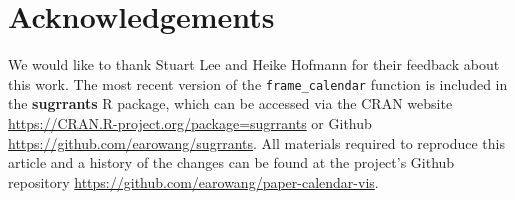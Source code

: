 \documentclass[12pt]{article}
\begin{document}
\hypertarget{acknowledgements}{%
\section*{Acknowledgements}\label{acknowledgements}}

We would like to thank Stuart Lee and Heike Hofmann for their feedback about this work. The most recent version of the \texttt{frame\_calendar} function is included in the \textbf{sugrrants} R package, which can be accessed via the CRAN website \url{https://CRAN.R-project.org/package=sugrrants} or Github \url{https://github.com/earowang/sugrrants}. All materials required to reproduce this article and a history of the changes can be found at the project's Github repository \url{https://github.com/earowang/paper-calendar-vis}.



\end{document}
